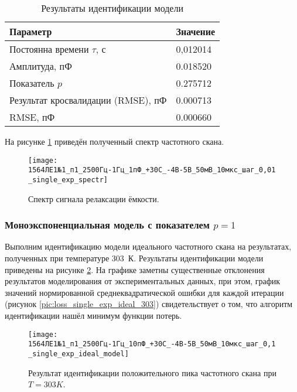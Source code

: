 	\begin{table}[!htp]
		\centering
		\caption{Результаты идентификации модели}
		\begin{tabular}{|l|l|}
			\hline
			Параметр                           & Значение \\ \hline
			Постоянна времени $\tau$, с        & 0,012014 \\ \hline
			Амплитуда, пФ                      & 0.018520 \\ \hline
			Показатель $p$                     & 0.275712 \\ \hline
			Результат кросвалидации (RMSE), пФ & 0.000713 \\ \hline
			RMSE, пФ                           & 0.000660 \\ \hline
		\end{tabular}
		\label{table:results_single_exp_ideal_303}
	\end{table}

	На рисунке \ref{pic:spectr_single_exp_303} приведён полученный спектр 
	частотного скана.

	\begin{figure}[!htp]
		\centering
		\texttt{[image: 1564ЛЕ1№1\_п1\_2500Гц-1Гц\_1пФ\_+30С\_-4В-5В\_50мВ\_10мкс\_шаг\_0,01\_single\_exp\_spectr]}
		\caption{Спектр сигнала релаксации ёмкости.}
		\label{pic:spectr_single_exp_303}
	\end{figure}


	\newpage
	\subsubsection{Моноэкспоненциальная модель с показателем $p=1$}
	Выполним идентификацию модели идеального частотного скана на результатах,
	полученных при температуре 303~К. Результаты идентификации модели приведены 
	на рисунке \ref{pic:model_single_exp_ideal_303}. На графике заметны
	существенные отклонения результатов моделирования от экспериментальных 
	данных, при этом, график значений нормированной среднеквадратической ошибки
	для каждой итерации (рисунок \ref{pic:loss_single_exp_ideal_303}) 
	свидетельствует о том, что алгоритм идентификации нашёл минимум функции 
	потерь.

	\begin{figure}[!htp]
		\centering
		\texttt{[image: 1564ЛЕ1№1\_п1\_2500Гц-1Гц\_10пФ\_+30С\_-4В-5В\_50мВ\_10мкс\_шаг\_0,1\_single\_exp\_ideal\_model]}
		\caption{Результат идентификации положительного пика частотного скана
		         при $T=303K$.}
		\label{pic:model_single_exp_ideal_303}
	\end{figure}

